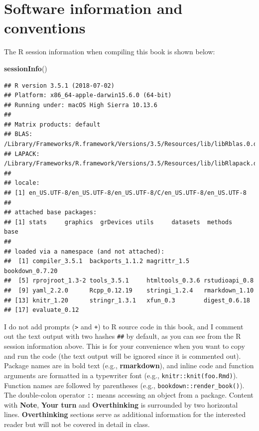 \documentclass[]{book}
\newenvironment{Shaded}{\begin{snugshade}}{\end{snugshade}}
\newcommand{\KeywordTok}[1]{\textcolor[rgb]{0.13,0.29,0.53}{\textbf{#1}}}
\newcommand{\NormalTok}[1]{#1}
\begin{document}
\hypertarget{software-information-and-conventions}{%
\section*{Software information and
conventions}\label{software-information-and-conventions}}

The R session information when compiling this book is shown below:

\begin{Shaded}
\begin{Highlighting}[]
\KeywordTok{sessionInfo}\NormalTok{()}
\end{Highlighting}
\end{Shaded}

\begin{verbatim}
## R version 3.5.1 (2018-07-02)
## Platform: x86_64-apple-darwin15.6.0 (64-bit)
## Running under: macOS High Sierra 10.13.6
## 
## Matrix products: default
## BLAS: /Library/Frameworks/R.framework/Versions/3.5/Resources/lib/libRblas.0.dylib
## LAPACK: /Library/Frameworks/R.framework/Versions/3.5/Resources/lib/libRlapack.dylib
## 
## locale:
## [1] en_US.UTF-8/en_US.UTF-8/en_US.UTF-8/C/en_US.UTF-8/en_US.UTF-8
## 
## attached base packages:
## [1] stats     graphics  grDevices utils     datasets  methods   base     
## 
## loaded via a namespace (and not attached):
##  [1] compiler_3.5.1  backports_1.1.2 magrittr_1.5    bookdown_0.7.20
##  [5] rprojroot_1.3-2 tools_3.5.1     htmltools_0.3.6 rstudioapi_0.8 
##  [9] yaml_2.2.0      Rcpp_0.12.19    stringi_1.2.4   rmarkdown_1.10 
## [13] knitr_1.20      stringr_1.3.1   xfun_0.3        digest_0.6.18  
## [17] evaluate_0.12
\end{verbatim}

I do not add prompts (\texttt{\textgreater{}} and \texttt{+}) to R
source code in this book, and I comment out the text output with two
hashes \texttt{\#\#} by default, as you can see from the R session
information above. This is for your convenience when you want to copy
and run the code (the text output will be ignored since it is commented
out). Package names are in bold text (e.g., \textbf{rmarkdown}), and
inline code and function arguments are formatted in a typewriter font
(e.g.,
\texttt{knitr::knit(\textquotesingle{}foo.Rmd\textquotesingle{})}).
Function names are followed by parentheses (e.g.,
\texttt{bookdown::render\_book()}). The double-colon operator
\texttt{::} means accessing an object from a package. Content with
\textbf{Note}, \textbf{Your turn} and \textbf{Overthinking} is
surrounded by two horizontal lines. \textbf{Overthinking} sections serve
as additional information for the interested reader but will not be
covered in detail in class.
\end{document}
